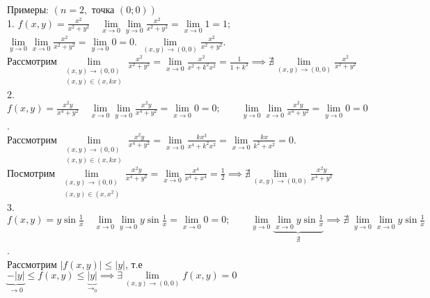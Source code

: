 \documentclass[../main.tex]{subfiles}
\begin{document}
Примеры: $(n=2, \text{ точка }(0;0))$ 
\\1. $f(x,y)=\frac{x^{2}}{x^{2}+y^{2}}\quad \lim\limits_{x\to 0} \lim\limits_{y\to 0} \frac{x^{2}}{x^{2}+y^{2}}=\lim\limits_{x\to 0} 1=1 $;\qquad $\lim\limits_{y\to 0} \lim\limits_{x\to 0}\frac{x^{2}}{x^{2}+y^{2}} =\lim\limits_{y\to 0} 0 = 0$. $\lim\limits_{(x,y)\to (0,0)}\frac{x^{2}}{x^{2}+y^{2}}$.\\ Рассмотрим $\lim\limits_{\substack{(x,y)\to (0,0)\\(x,y)\in(x,kx)}}\frac{x^{2}}{x^{2}+y^{2}}= \lim\limits_{x\to 0}\frac{x^{2}}{x^{2}+k^{2}x^{2}}=\frac{1}{1+k^{2}}\implies \nexists \lim\limits_{(x,y)\to (0,0)}\frac{x^{2}}{x^{2}+y^{2}}   $
\\2.$f(x,y)=\frac{x^{2}y}{x^{4}+y^{2}} \quad \lim\limits_{x\to 0} \lim\limits_{y\to 0} \frac{x^{2}y}{x^{4}+y^{2}}=\lim\limits_{x\to 0} 0=0;\qquad \lim\limits_{y\to 0}\lim\limits_{x\to 0} \frac{x^{2}y        }{x^{4}+y^{2}}=\lim\limits_{y\to 0} 0=0$. \\Рассмотрим $\lim\limits_{\substack{(x,y)\to (0,0)\\(x,y)\in(x,kx)}} \frac{x^{2}y}{x^{4}+y^{2}}=\lim\limits_{x\to 0}\frac{kx^{3}}{x^{4}+k^{2}x^{2}}=\lim\limits_{x\to 0}  \frac{kx}{k^{2}+x^{2}}=0$. \\Посмотрим $\lim\limits_{\substack{(x,y)\to (0,0)\\ (x,y)\in(x,x^{2})}} \frac{x^{2}y}{x^{4}+y^{2}}=\lim\limits_{x\to 0}   \frac{x^{4}}{x^{4}+x^{4}}=\frac{1}{2}\implies \nexists \lim\limits_{(x,y)\to (0,0)}\frac{x^{2}y}{x^{4}+y^{2}} $
\\3. $f(x,y)=y\sin{\frac{1}{x}}\quad \lim\limits_{x\to 0} \lim\limits_{y\to 0} y\sin{\frac{1}{x}}=\lim\limits_{x\to 0} 0    =0;\qquad \lim\limits_{y\to 0} \underbrace{\lim\limits_{x\to 0} y\sin{\frac{1}{x}}}_{\nexists} \implies  \nexists \;\lim\limits_{y\to 0} \lim\limits_{x\to 0} y\sin{\frac{1}{x}}$.
\\Рассмотрим $|f(x,y)|\leqslant|y|$, т.е $\underbrace{-|y|}_{\to 0} \leqslant f(x,y)\leqslant \underbrace{|y|}_{\to_{0}} \implies \exists \lim\limits_{ (x,y)\to (0,0)}f(x,y)=0 $
\end{document}
